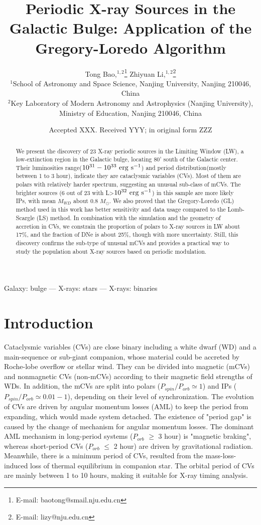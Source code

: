 \documentclass[fleqn,usenatbib]{mnras}
\title[Periodic X-ray Sources in the Galactic Bulge]{Periodic X-ray Sources in the Galactic Bulge: Application of the Gregory-Loredo Algorithm}
\author[Bao \& Li]{
Tong Bao,$^{1,2}$\thanks{E-mail: baotong@smail.nju.edu.cn}
Zhiyuan Li,$^{1,2}$\thanks{E-mail: lizy@nju.edu.cn}
\\
$^{1}$School of Astronomy and Space Science, Nanjing University, Nanjing 210046, China\\
$^{2}$Key Laboratory of Modern Astronomy and Astrophysics (Nanjing University), Ministry of Education, Nanjing 210046, China
}
\date{Accepted XXX. Received YYY; in original form ZZZ}
\begin{document}
\maketitle
\begin{abstract}
We present the discovery of 23 X-ray periodic sources in the Limiting Window (LW), a low-extinction region in the Galactic bulge, locating 80' south of the Galactic center. Their luminosities range(${\rm 10^{31}-10^{33} ~erg ~ s^{-1}}$) and period distribution(mostly between 1 to 3 hour), indicate they are cataclysmic variables (CVs). Most of them are polars with relatively harder spectrum, suggesting an unusual sub-class of mCVs.
The brighter sources (6 out of 23 with L>$\rm 10^{32} ~erg~s^{-1}$) in this sample are more likely IPs, with mean $M_{WD}$ about 0.8 $M_\odot$.
We also proved that the Gregory-Loredo (GL) method used in this work has better sensitivity and data usage compared to the Lomb-Scargle (LS) method. In combination with the simulation and the geometry of accretion in CVs, we constrain the proportion of polars to X-ray sources in LW about 17\%, and the fraction of DNe is about 25\%, though with more uncertainty. Still, this discovery confirms the sub-type of unusual mCVs and provides a practical way to study the population about X-ray sources based on periodic modulation.
\end{abstract}

\begin{keywords}
Galaxy: bulge --- X-rays: stars --- X-rays: binaries
\end{keywords}

\section{Introduction} \label{sec:intro}
Cataclysmic variables (CVs) are close binary including a white dwarf (WD) and a main-sequence or sub-giant companion, whose material could be accreted by Roche-lobe overflow or stellar wind. 
They can be divided into magnetic (mCVs) and nonmagnetic CVs (non-mCVs) according to their magnetic field strengths of WDs. In addition, the mCVs are split into polars ($P_{spin}/P_{orb}\simeq 1$) and IPs ($P_{spin}/P_{orb}\simeq 0.01-1$), depending on their level of synchronization. 
The evolution of CVs are driven by angular momentum losses (AML) to keep the period from expanding, which would made system detached. The existence of  "period gap" is caused by the change of mechanism for angular momentum losses.  The dominant AML mechanism in long-period
systems ($P_{orb}$ $\geq$ 3 hour) is "magnetic braking", whereas short-period CVs ($P_{orb}$ $\leq$ 2 hour) are  driven by gravitational radiation. Meanwhile, there is a minimum period of CVs, resulted from the mass-loss-induced loss of thermal equilibrium in companion star. The orbital period of CVs are mainly between 1 to 10 hours, making it suitable for X-ray timing analysis. 
\end{document}

